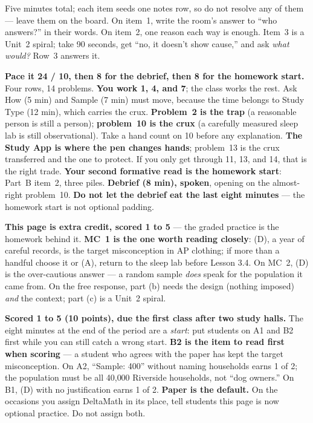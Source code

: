 \documentclass[10pt]{article}
\begin{document}
\begin{teachernote}[Warm-Up]
Five minutes total; each item seeds one notes row, so do not resolve any of them --- leave
them on the board. On item~1, write the room's answer to ``who answers?'' in their words. On
item~2, one reason each way is enough. Item~3 is a Unit~2 spiral; take 90 seconds, get ``no,
it doesn't show cause,'' and ask \emph{what would?} Row~3 answers it.
\end{teachernote}

\begin{teachernote}
\textbf{Pace it 24 / 10, then 8 for the debrief, then 8 for the homework start.} Four rows, 14
problems. \textbf{You work 1, 4, and 7}; the class works the rest. Ask How (5 min) and Sample (7
min) must move, because the time belongs to Study Type (12 min), which carries the crux.
\textbf{Problem~2 is the trap} (a reasonable person is still a person); \textbf{problem~10 is the
crux} (a carefully measured sleep lab is still observational). Take a hand count on 10 before
any explanation. \textbf{The Study App is where the pen changes hands}; problem~13 is the crux
transferred and the one to protect. If you only get through 11, 13, and 14, that is the right
trade. \textbf{Your second formative read is the homework start}: Part~B item~2, three piles.
\textbf{Debrief (8 min), spoken}, opening on the almost-right problem~10. \textbf{Do not let the
debrief eat the last eight minutes} --- the homework start is not optional padding.
\end{teachernote}

\begin{teachernote}[AP Practice]
\textbf{This page is extra credit, scored 1 to 5} --- the graded practice is the homework
behind it. \textbf{MC~1 is the one worth reading closely}: (D), a year of careful records, is
the target misconception in AP clothing; if more than a handful choose it or (A), return to
the sleep lab before Lesson 3.4. On MC~2, (D) is the over-cautious answer --- a random sample
\emph{does} speak for the population it came from. On the free response, part (b) needs the
design (nothing imposed) \emph{and} the context; part (c) is a Unit~2 spiral.
\end{teachernote}

\begin{teachernote}[Homework]
\textbf{Scored 1 to 5 (10 points), due the first class after two study halls.} The eight
minutes at the end of the period are a \emph{start}: put students on A1 and B2 first while you
can still catch a wrong start. \textbf{B2 is the item to read first when scoring} --- a student
who agrees with the paper has kept the target misconception. On A2, ``Sample: 400'' without
naming households earns 1 of 2; the population must be all 40{,}000 Riverside households, not
``dog owners.'' On B1, (D) with no justification earns 1 of 2. \textbf{Paper is the default.}
On the occasions you assign DeltaMath in its place, tell students this page is now optional
practice. Do not assign both.
\end{teachernote}
\end{document}
